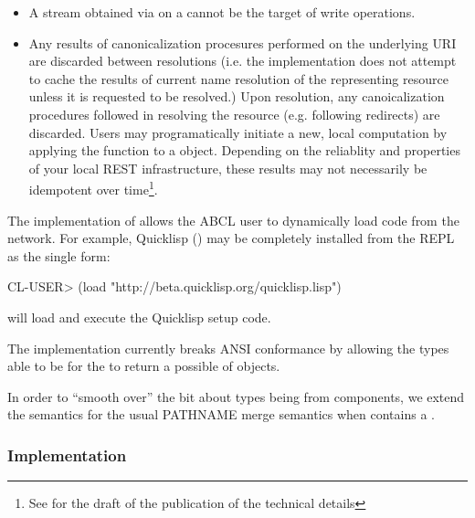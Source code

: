 \documentclass[10pt]{book}
\begin{document}
\begin{itemize}

\item A stream obtained via  on a 
  cannot be the target of write operations.

\item Any results of canonicalization procesures performed on the
  underlying \textsc{URI} are discarded between resolutions (i.e. the
  implementation does not attempt to cache the results of current name
  resolution of the representing resource unless it is requested to be
  resolved.)  Upon resolution, any canoicalization procedures
  followed in resolving the resource (e.g. following redirects) are
  discarded.  Users may programatically initiate a new, local
  computation by applying the  function to a
   object.  Depending on the reliablity and
  properties of your local \textsc{REST} infrastructure, these results
  may not necessarily be idempotent over time\footnote {See
    \cite{evenson2011} for the draft of the publication of the
    technical details}.

\end{itemize}

The implementation of  allows the \textsc{ABCL}
user to dynamically load code from the network.  For example,
Quicklisp (\cite{quicklisp}) may be completely installed from the \textsc{REPL}
as the single form:

\begin{listing-lisp}
  CL-USER> (load "http://beta.quicklisp.org/quicklisp.lisp")
\end{listing-lisp}

will load and execute the Quicklisp setup code.

The implementation currently breaks \textsc{ANSI} conformance by allowing the
types able to be  for the  to return a possible  of
 objects.  %

In order to ``smooth over'' the bit about types being  from
 components, we extend the semantics for the usual PATHNAME
merge semantics when  contains a
.  


\subsubsection{Implementation}
\end{document}
